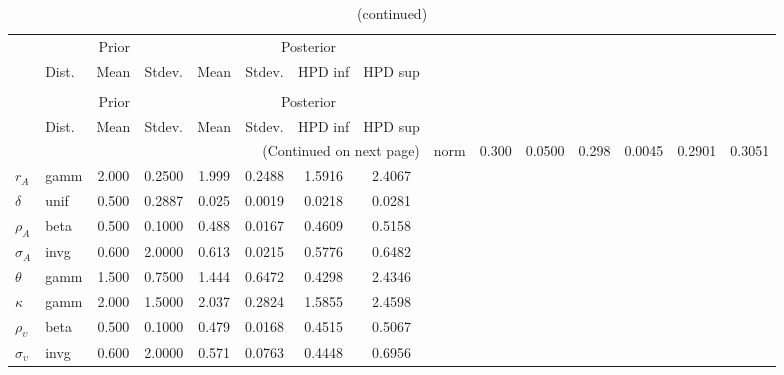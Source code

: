  
\begin{center}
\begin{longtable}{llcccccc} 
\caption{Results from Metropolis-Hastings (parameters)}
 \label{Table:MHPosterior:1}\\
\toprule 
  & \multicolumn{3}{c}{Prior}  &  \multicolumn{4}{c}{Posterior} \\
  \cmidrule(r{.75em}){2-4} \cmidrule(r{.75em}){5-8}
  & Dist. & Mean  & Stdev. & Mean & Stdev. & HPD inf & HPD sup\\
\midrule \endfirsthead 
\caption{(continued)}\\\toprule 
  & \multicolumn{3}{c}{Prior}  &  \multicolumn{4}{c}{Posterior} \\
  \cmidrule(r{.75em}){2-4} \cmidrule(r{.75em}){5-8}
  & Dist. & Mean  & Stdev. & Mean & Stdev. & HPD inf & HPD sup\\
\midrule \endhead 
\bottomrule \multicolumn{8}{r}{(Continued on next page)} \endfoot 
\bottomrule \endlastfoot 
${\alpha}$ & norm &   0.300 & 0.0500 &   0.298& 0.0045 &  0.2901 &  0.3051 \\ 
${r_{A}}$ & gamm &   2.000 & 0.2500 &   1.999& 0.2488 &  1.5916 &  2.4067 \\ 
${\delta}$ & unif &   0.500 & 0.2887 &   0.025& 0.0019 &  0.0218 &  0.0281 \\ 
${\rho_A}$ & beta &   0.500 & 0.1000 &   0.488& 0.0167 &  0.4609 &  0.5158 \\ 
${\sigma_A}$ & invg &   0.600 & 2.0000 &   0.613& 0.0215 &  0.5776 &  0.6482 \\ 
${\theta}$ & gamm &   1.500 & 0.7500 &   1.444& 0.6472 &  0.4298 &  2.4346 \\ 
${\kappa}$ & gamm &   2.000 & 1.5000 &   2.037& 0.2824 &  1.5855 &  2.4598 \\ 
${\rho_\upsilon}$ & beta &   0.500 & 0.1000 &   0.479& 0.0168 &  0.4515 &  0.5067 \\ 
${\sigma_\upsilon}$ & invg &   0.600 & 2.0000 &   0.571& 0.0763 &  0.4448 &  0.6956 \\ 
\end{longtable}
 \end{center}
